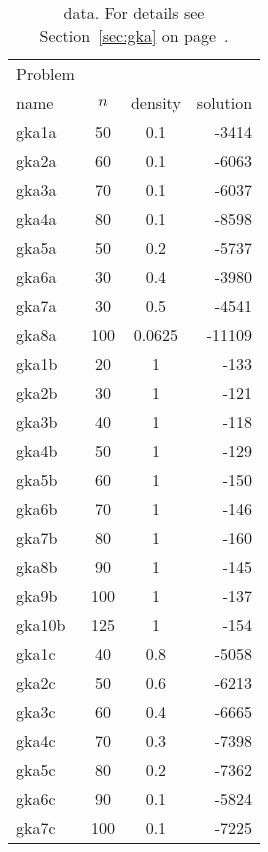 \documentclass[a4paper, 12pt]{article}
\begin{document}
\begin{table}
\begin{center}
\begin{tabular}{|l|cc|r|}
\hline
Problem     &         &          &\\
name & $n$ & density &\multicolumn{1}{|c|}{solution}\\
\hline
gka1a & 50 & 0.1 & -3414 \\
gka2a & 60 & 0.1 & -6063 \\
gka3a & 70 & 0.1 & -6037 \\
gka4a & 80 & 0.1 & -8598 \\
gka5a & 50 & 0.2 & -5737 \\
gka6a & 30 & 0.4 & -3980 \\
gka7a & 30 & 0.5 & -4541 \\
gka8a & 100 & 0.0625 & -11109 \\
\hline
gka1b  &  20 & 1 & -133 \\
gka2b  &  30 & 1 & -121 \\
gka3b  &  40 & 1 & -118 \\
gka4b  &  50 & 1 & -129 \\
gka5b  &  60 & 1 & -150 \\
gka6b  &  70 & 1 & -146 \\
gka7b  &  80 & 1 & -160 \\
gka8b  &  90 & 1 & -145 \\
gka9b  & 100 & 1 & -137 \\
gka10b & 125 & 1 & -154 \\
\hline
gka1c &  40 & 0.8 & -5058 \\
gka2c &  50 & 0.6 & -6213 \\
gka3c &  60 & 0.4 & -6665 \\
gka4c &  70 & 0.3 & -7398 \\
gka5c &  80 & 0.2 & -7362 \\
gka6c &  90 & 0.1 & -5824 \\
gka7c & 100 & 0.1 & -7225 \\
\hline
\end{tabular}
\caption{\cite{GlKoAl:98} data. For details see Section~\ref{sec:gka}
  on page~\pageref{sec:gka}.} \label{tab:gka1} 
\end{center} \end{table}
\end{document}

